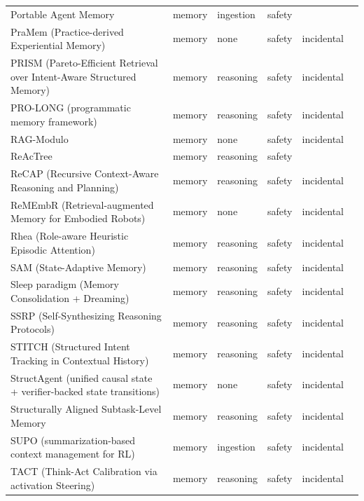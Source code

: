 \begin{longtable}{@{}>{\raggedright\arraybackslash}p{}lllll@{}}
Portable Agent Memory & memory & ingestion & safety &  & \cite{ravindran-2026-portable} \\
PraMem (Practice-derived Experiential Memory) & memory & none & safety & incidental & \cite{li-2026-pramem} \\
PRISM (Pareto-Efficient Retrieval over Intent-Aware Structured Memory) & memory & reasoning & safety & incidental & \cite{peng-2026-prism} \\
PRO-LONG (programmatic memory framework) & memory & reasoning & safety & incidental & \cite{fox-2026-prolong} \\
RAG-Modulo & memory & none & safety & incidental & \cite{jain-2024-ragmodulo} \\
ReAcTree & memory & reasoning & safety &  & \cite{choi-2025-reactree} \\
ReCAP (Recursive Context-Aware Reasoning and Planning) & memory & reasoning & safety & incidental & \cite{zhang-2025-recap} \\
ReMEmbR (Retrieval-augmented Memory for Embodied Robots) & memory & none & safety & incidental & \cite{anwar-2024-remembr} \\
Rhea (Role-aware Heuristic Episodic Attention) & memory & reasoning & safety & incidental & \cite{hong-2025-rhea} \\
SAM (State-Adaptive Memory) & memory & reasoning & safety & incidental & \cite{hu-2026-sam} \\
Sleep paradigm (Memory Consolidation + Dreaming) & memory & reasoning & safety & incidental & \cite{behrouz-2026-language} \\
SSRP (Self-Synthesizing Reasoning Protocols) & memory & reasoning & safety & incidental & \cite{shehata-2026-attention} \\
STITCH (Structured Intent Tracking in Contextual History) & memory & reasoning & safety & incidental & \cite{yang-2026-grounding} \\
StructAgent (unified causal state + verifier-backed state transitions) & memory & none & safety & incidental & \cite{wu-2026-structagent} \\
Structurally Aligned Subtask-Level Memory & memory & reasoning & safety & incidental & \cite{shen-2026-structurally} \\
SUPO (summarization-based context management for RL) & memory & ingestion & safety & incidental & \cite{lu-2025-scaling} \\
TACT (Think-Act Calibration via activation Steering) & memory & reasoning & safety & incidental & \cite{sui-2026-tact} \\

\end{longtable}
